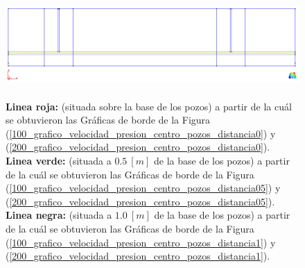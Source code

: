\documentclass[10pt,a4paper,final]{article}
\begin{document}
\begin{figure}[tbhp]
\centerline{\includegraphics[scale=0.4]{img/200m/perfiles}}
\caption{\\\textbf{Linea roja:} (situada sobre la base de los pozos) a partir de la cuál se obtuvieron las Gráficas de borde de la Figura (\ref{100_grafico_velocidad_presion_centro_pozos_distancia0}) y (\ref{200_grafico_velocidad_presion_centro_pozos_distancia0}).\\
\textbf{Linea verde:} (situada a $0.5~[m]$ de la base de los pozos) a partir de la cuál se obtuvieron las Gráficas de borde de la Figura (\ref{100_grafico_velocidad_presion_centro_pozos_distancia05}) y (\ref{200_grafico_velocidad_presion_centro_pozos_distancia05}).
\\\textbf{Linea negra:} (situada a $1.0~[m]$ de la base de los pozos) a partir de la cuál se obtuvieron las Gráficas de borde de la Figura (\ref{100_grafico_velocidad_presion_centro_pozos_distancia1}) y (\ref{200_grafico_velocidad_presion_centro_pozos_distancia1}).}
\label{perfiles}
\end{figure}
\end{document}
